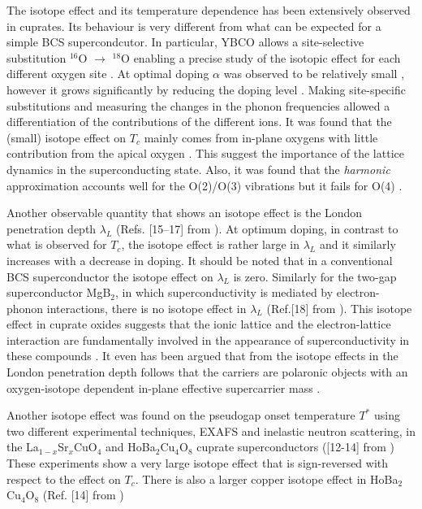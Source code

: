 The isotope effect and its temperature dependence has been extensively observed in cuprates.
Its behaviour is very different from what can be expected for a simple BCS supercondcutor.
In particular, YBCO allows a site-selective substitution $^{16}$O $\rightarrow$ $^{18}$O \cite{Conder1993} enabling a precise study of the isotopic effect for each different oxygen site \cite{Cardona1988}. 
At optimal doping $\alpha$ was observed to be relatively small \cite{Thomsen1988}, however it grows significantly by reducing the doping level \cite{Bishop2007}.
Making site-specific substitutions and measuring the changes in the phonon frequencies  allowed a differentiation of the contributions of the different ions.
It was found that the (small) isotope effect on $T_c$ mainly comes from in-plane oxygens with little contribution from the apical oxygen  \cite{Ruani1994,Zech1994}.
This suggest the importance of the lattice dynamics in the superconducting state.
Also, it was found that the \textit{harmonic} approximation accounts well for the O(2)/O(3) vibrations but it fails for O(4) \cite{Ruani1994}.

Another observable quantity that shows an isotope effect is the London penetration depth $\lambda_L$ \cite{?}(Refs. [15–17] from \cite{Bishop2007}).
At optimum doping, in contrast to what is observed for $T_c$, the isotope effect is rather large in $\lambda_L$ and it similarly increases with a decrease in doping.
It should be noted that in a conventional BCS superconductor the isotope effect on $\lambda_L$ is zero.
Similarly for the two-gap superconductor MgB$_2$, in which superconductivity is mediated by electron-phonon interactions, there is no isotope effect in $\lambda_L$ \cite{?}(Ref.[18] from \cite{Bishop2007}). 
This isotope effect in cuprate oxides suggests that the ionic lattice and the electron-lattice interaction are fundamentally involved in the appearance of superconductivity in these compounds \cite{Kresin2009}.
It even has been argued that from the isotope effects in the London penetration depth follows that the carriers are polaronic objects \cite{Zhao1997} with an oxygen-isotope dependent in-plane effective supercarrier mass \cite{Khasanov2004}.

Another isotope effect was found on the pseudogap onset temperature $T^*$ using two different experimental techniques, EXAFS and inelastic neutron scattering, in the La$_{1-x}$Sr$_x$CuO$_4$ and HoBa$_2$Cu$_4$O$_8$ cuprate superconductors \cite{?} ([12-14] from \cite{Bishop2007})
These experiments show a very large isotope effect that is sign-reversed with respect to the effect on $T_c$.
There is also a larger copper isotope effect in HoBa$_2$Cu$_4$O$_8$ \cite{?} (Ref. [14] from \cite{Bishop2007})

